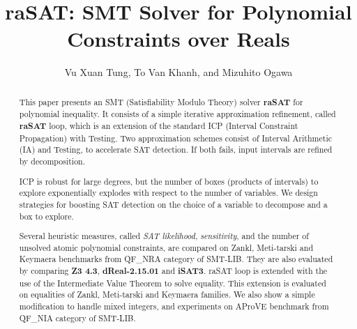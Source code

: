 \documentclass[runningheads,a4paper,oribibl]{llncs}
\begin{document}
%
\title{{\bf raSAT}: SMT Solver for Polynomial Constraints over Reals}

\author{Vu Xuan Tung, To Van Khanh, and Mizuhito Ogawa} 


\maketitle

\begin{abstract}
This paper presents an SMT (Satisfiability Modulo Theory) solver {\bf raSAT} for polynomial inequality. 
It consists of a simple iterative approximation refinement, called {\bf raSAT} loop, 
which is an extension of the standard ICP (Interval Constraint Propagation) with Testing. 
Two approximation schemes consist of Interval Arithmetic (IA) and 
Testing, to accelerate SAT detection. 
If both fails, input intervals are refined by decomposition. 

ICP is robust for large degrees, but the number of boxes (products of intervals) to explore 
exponentially explodes with respect to the number of variables. 
We design strategies for boosting SAT detection on the choice of a variable to decompose
and a box to explore. 

Several heuristic measures, called {\em SAT likelihood}, {\em sensitivity}, and the number of 
unsolved atomic polynomial constraints, are compared on Zankl, Meti-tarski and Keymaera benchmarks from 
QF\_NRA category of SMT-LIB. They are also evaluated by comparing {\bf Z3 4.3}, \textbf{dReal-2.15.01} and {\bf iSAT3}. 
raSAT loop is extended with the use of the Intermediate Value Theorem to solve equality. This extension is evaluated on equalities of Zankl, Meti-tarski and Keymaera families.
We also show a simple modification to handle mixed integers, and experiments on 
AProVE benchmark from QF\_NIA category of SMT-LIB. 
\end{abstract}
\end{document}

